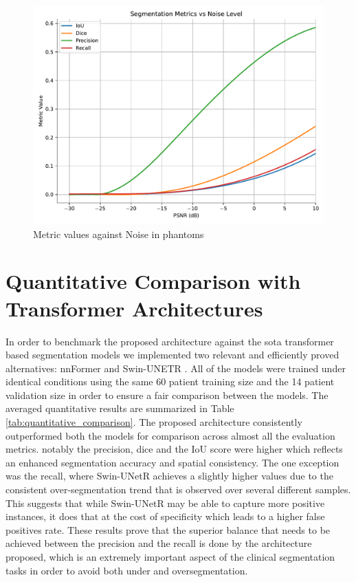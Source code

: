\begin{figure}[htb!] %
\centering
\centering
\includegraphics[width=1\textwidth]{images/metrics_vs_noise_cubic.pdf}
\caption{\centering Metric values against Noise in phantoms}
\label{Fig:noise}
\end{figure}

\section{Quantitative Comparison with Transformer Architectures}
In order to benchmark the proposed architecture against the \gls{sota} transformer based segmentation models we implemented two relevant and efficiently proved alternatives: nnFormer \cite{zhou2023nnformer} and Swin-UNETR \cite{10.1007/978-3-031-08999-2_22}. All of the models were trained under identical conditions using the same 60 patient training size and the 14 patient validation size in order to ensure a fair comparison between the models. The averaged quantitative results are summarized in Table \ref{tab:quantitative_comparison}. The proposed architecture consistently outperformed both the models for comparison across almost all the evaluation metrics. notably the precision, dice and the IoU score were higher which reflects an enhanced segmentation accuracy and spatial consistency. The one exception was the recall, where Swin-UNetR achieves a slightly higher values due to the consistent over-segmentation trend that is observed over several different samples. This suggests that while Swin-UNetR may be able to capture more positive instances, it does that at the cost of specificity which leads to a higher false positives rate. These results prove that the superior balance that needs to be achieved between the precision and the recall is done by the architecture proposed, which is an extremely important aspect of the clinical segmentation tasks in order to avoid both under and oversegmentation.

